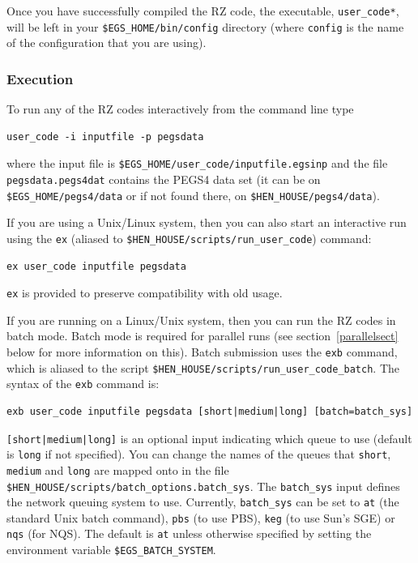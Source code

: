 \documentclass[12pt,twoside]{article}  %
\begin{document}
Once you have successfully compiled the RZ code, the executable,
{\tt user\_code*}, will be left in your {\tt \$EGS\_HOME/bin/config} directory
(where {\tt config} is the name of the configuration that you are using).

\subsubsection{Execution}
\label{execsect}

To run any of the RZ codes interactively from the command line type
\begin{verbatim}
user_code -i inputfile -p pegsdata
\end{verbatim}
where the input file is {\tt \$EGS\_HOME/user\_code/inputfile.egsinp} and the
file\\
 {\tt pegsdata.pegs4dat} contains the PEGS4 data set (it can be on
{\tt \$EGS\_HOME/pegs4/data} or if not found there, on
{\tt \$HEN\_HOUSE/pegs4/data}).

If you are using a Unix/Linux system, then you can also start
an interactive run using
the {\tt ex} (aliased to {\tt \$HEN\_HOUSE/scripts/run\_user\_code})
command:
\begin{verbatim}
ex user_code inputfile pegsdata
\end{verbatim}
{\tt ex} is provided to preserve compatibility with old usage.
 
If you are running on a Linux/Unix system, then you can run 
the RZ codes in batch mode.  Batch mode is required for 
parallel runs (see section~\ref{parallelsect} below for more information
on this).
Batch submission uses the {\tt exb} command, which is aliased to
the script {\tt \$HEN\_HOUSE/scripts/run\_user\_code\_batch}.  The syntax
of the {\tt exb} command is:
\begin{verbatim}
exb user_code inputfile pegsdata [short|medium|long] [batch=batch_sys]
\end{verbatim}
    
{\tt [short|medium|long]} is an optional
input indicating which queue to use (default is {\tt long} if not
specified).  You can change the names of the queues that {\tt short},
{\tt medium} and {\tt long} are mapped onto in the
file {\tt \$HEN\_HOUSE/scripts/batch\_options.batch\_sys}.
The {\tt batch\_sys} input
defines the network queuing system to use.  Currently,
{\tt batch\_sys} can be set to {\tt at} (the standard Unix batch
command), {\tt pbs} (to use PBS), {\tt keg} (to use Sun's SGE) or
{\tt nqs} (for NQS).  The default is {\tt at} unless otherwise specified
by setting the environment variable {\tt \$EGS\_BATCH\_SYSTEM}.
\end{document}
